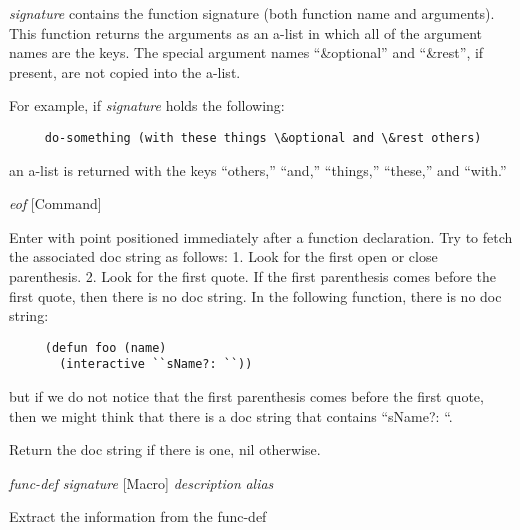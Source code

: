 \begin{doc-string}
\emph{signature} contains the function signature (both function name and arguments).
This function returns the arguments as an a-list in which all of the argument
names are the keys.  The special argument names ``\&optional'' and ``\&rest'', if
present, are not copied into the a-list.

For example, if \emph{signature} holds the following:

\begin{verbatim}
     do-something (with these things \&optional and \&rest others)
\end{verbatim}

an a-list is returned with the keys ``others,'' ``and,'' ``things,'' ``these,'' and
``with.''
\end{doc-string}

\vspace{1em}
\noindent
{}
\usebox{\funcname}\emph{eof}
 \hfill [Command]

\begin{doc-string}
Enter with point positioned immediately after a function declaration.  Try to
fetch the associated doc string as follows:  1. Look for the first open or close
parenthesis.  2. Look for the first quote.  If the first parenthesis comes before
the first quote, then there is no doc string.  In the following function, there is
no doc string:

\begin{verbatim}
     (defun foo (name)
       (interactive ``sName?: ``))
\end{verbatim}

but if we do not notice that the first parenthesis comes before the first quote, then
we might think that there is a doc string that contains ``sName?: ``.

Return the doc string if there is one, nil otherwise.
\end{doc-string}

\vspace{1em}
\noindent
{}
\usebox{\funcname}\emph{func-def} \emph{signature}
 \hfill [Macro]
\hspace*{\wd\funcname}\emph{description} \emph{alias}

\begin{doc-string}
Extract the information from the func-def
\end{doc-string}

